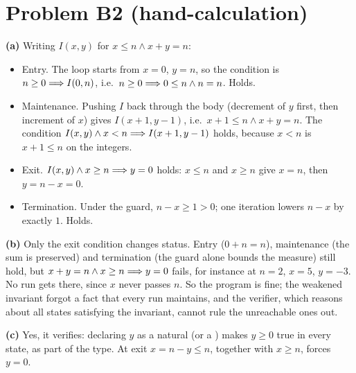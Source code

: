 \documentclass[11pt]{article}
\begin{document}
\section*{Problem B2 (hand-calculation)}\label{ans:B2}
\begin{answer}
\textbf{(a)} Writing $I(x, y)$ for $x \leq n \wedge x + y = n$:
\begin{itemize}
\item Entry. The loop starts from $x = 0$, $y = n$, so the condition is
  $n \geq 0 \Longrightarrow I(0, n)$, i.e.\ $n \geq 0 \Longrightarrow 0 \leq n \wedge n = n$.
  Holds.
\item Maintenance. Pushing $I$ back through the body (decrement of $y$ first,
  then increment of $x$) gives $I(x + 1, y - 1)$, i.e.\
  $x + 1 \leq n \wedge x + y = n$. The condition
  $I(x, y) \wedge x < n \Longrightarrow I(x + 1, y - 1)$ holds, because $x < n$ is
  $x + 1 \leq n$ on the integers.
\item Exit. $I(x, y) \wedge x \geq n \Longrightarrow y = 0$ holds: $x \leq n$ and
  $x \geq n$ give $x = n$, then $y = n - x = 0$.
\item Termination. Under the guard, $n - x \geq 1 > 0$; one iteration lowers
  $n - x$ by exactly $1$. Holds.
\end{itemize}

\textbf{(b)} Only the exit condition changes status. Entry ($0 + n = n$),
maintenance (the sum is preserved) and termination (the guard alone bounds
the measure) still hold, but
$x + y = n \wedge x \geq n \Longrightarrow y = 0$ fails, for instance at $n = 2$, $x = 5$,
$y = -3$. No run gets there, since $x$ never passes $n$. So the program is
fine; the weakened invariant forgot a fact that every run maintains, and the
verifier, which reasons about all states satisfying the invariant, cannot
rule the unreachable ones out.

\textbf{(c)} Yes, it verifies: declaring $y$ as a natural (or a )
makes $y \geq 0$ true in every state, as part of the type. At exit
$x = n - y \leq n$, together with $x \geq n$, forces $y = 0$.
\end{answer}

\end{document}
